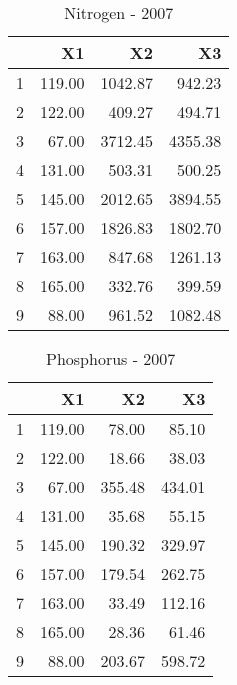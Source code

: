 \documentclass{article}\usepackage{graphicx, color}
\begin{document}
\begin{table}[ht]
\centering
\begin{tabular}{rrrr}
  \hline
 & X1 & X2 & X3 \\ 
  \hline
1 & 119.00 & 1042.87 & 942.23 \\ 
  2 & 122.00 & 409.27 & 494.71 \\ 
  3 & 67.00 & 3712.45 & 4355.38 \\ 
  4 & 131.00 & 503.31 & 500.25 \\ 
  5 & 145.00 & 2012.65 & 3894.55 \\ 
  6 & 157.00 & 1826.83 & 1802.70 \\ 
  7 & 163.00 & 847.68 & 1261.13 \\ 
  8 & 165.00 & 332.76 & 399.59 \\ 
  9 & 88.00 & 961.52 & 1082.48 \\ 
   \hline
\end{tabular}
\caption{Nitrogen - 2007} 
\end{table}

\begin{table}[ht]
\centering
\begin{tabular}{rrrr}
  \hline
 & X1 & X2 & X3 \\ 
  \hline
1 & 119.00 & 78.00 & 85.10 \\ 
  2 & 122.00 & 18.66 & 38.03 \\ 
  3 & 67.00 & 355.48 & 434.01 \\ 
  4 & 131.00 & 35.68 & 55.15 \\ 
  5 & 145.00 & 190.32 & 329.97 \\ 
  6 & 157.00 & 179.54 & 262.75 \\ 
  7 & 163.00 & 33.49 & 112.16 \\ 
  8 & 165.00 & 28.36 & 61.46 \\ 
  9 & 88.00 & 203.67 & 598.72 \\ 
   \hline
\end{tabular}
\caption{Phosphorus - 2007} 
\end{table}
\end{document}
